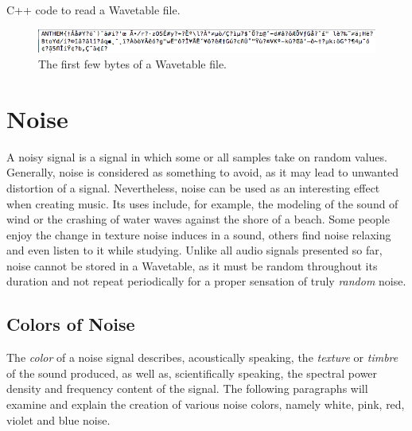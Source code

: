   \begin{table}[t!]
    \caption{C++ code to read a Wavetable file. }
    \label{code:wtfile}
  \end{table}

  \begin{figure}[h!]
    \includegraphics[scale=0.7]{img/wtfile}
    \caption{The first few bytes of a Wavetable file.}
    \label{fig:wtfile}
  \end{figure}

  \section{Noise}

  A noisy signal is a signal in which some or all samples take on random values. Generally, noise is considered as something to avoid, as it may lead to unwanted distortion of a signal. Nevertheless, noise can be used as an interesting effect when creating music. Its uses include, for example, the modeling of the sound of wind or the crashing of water waves against the shore of a beach. Some people enjoy the change in texture noise induces in a sound, others find noise relaxing and even listen to it while studying.  Unlike all audio signals\footnotemark{} presented so far, noise cannot\footnotemark{} be stored in a Wavetable, as it must be random throughout its duration and not repeat periodically for a proper sensation of truly \emph{random} noise.



  \subsection{Colors of Noise}

  The \emph{color} of a noise signal describes, acoustically speaking, the \emph{texture} or \emph{timbre} \footnotemark{} of the sound produced, as well as, scientifically speaking, the spectral power density and frequency content of the signal. The following paragraphs will examine and explain the creation of various noise colors, namely white, pink, red, violet and blue noise.

